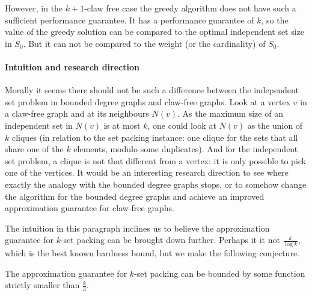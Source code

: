 However, in the $k+1$-claw free case the greedy algorithm does not have such a sufficient performance guarantee. It has a performance guarantee of $k$, %
so the value of the greedy solution can be compared to the optimal independent set size in $S_0$. But it can not be compared to the weight (or the cardinality) of $S_0$.

\paragraph{Intuition and research direction} Morally it seems there should not be such a difference between the independent set problem in bounded degree graphs and claw-free graphs. Look at a vertex $v$ in a claw-free graph and at its neighbours $N(v)$. As the maximum size of an independent set in $N(v)$ is at most $k$, one could look at $N(v)$ as the union of $k$ cliques (in relation to the set packing instance: one clique for the sets that all share one of the $k$ elements, modulo some duplicates). And for the independent set problem, a clique is not that different from a vertex: it is only possible to pick one of the vertices. It would be an interesting research direction to see where exactly the analogy with the bounded degree graphs stops, or to somehow change the algorithm for the bounded degree graphs and achieve an improved approximation guarantee for claw-free graphs.

The intuition in this paragraph inclines us to believe the approximation guarantee for $k$-set packing can be brought down further. Perhaps it it not $\frac{k}{\log k}$, which is the best known hardness bound, but we make the following conjecture.

\begin{conjecture}
The approximation guarantee for $k$-set packing can be bounded by some function strictly smaller than $\frac{k}{3}$.
\end{conjecture}



